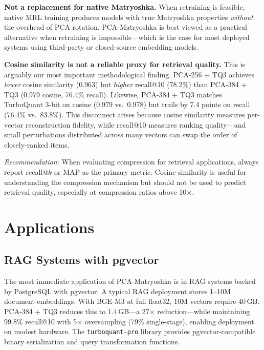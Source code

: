 \documentclass[journal]{IEEEtran}
\begin{document}
\textbf{Not a replacement for native Matryoshka.}
When retraining is feasible, native MRL training produces models with true Matryoshka properties \emph{without} the overhead of PCA rotation.
PCA-Matryoshka is best viewed as a practical alternative when retraining is impossible---which is the case for most deployed systems using third-party or closed-source embedding models.

\textbf{Cosine similarity is not a reliable proxy for retrieval quality.}
This is arguably our most important methodological finding.
PCA-256 + TQ3 achieves \emph{lower} cosine similarity (0.963) but \emph{higher}
recall@10 (78.2\%) than PCA-384 + TQ3 (0.979 cosine, 76.4\% recall).
Likewise, PCA-384 + TQ3 matches TurboQuant 3-bit on cosine (0.979 vs.\ 0.978) but
trails by 7.4 points on recall (76.4\% vs.\ 83.8\%).
This disconnect arises because cosine similarity measures per-vector reconstruction
fidelity, while recall@10 measures ranking quality---and small perturbations
distributed across many vectors can swap the order of closely-ranked items.

\emph{Recommendation:} When evaluating compression for retrieval applications,
always report recall@$k$ or MAP as the primary metric.  Cosine similarity is
useful for understanding the compression mechanism but should not be used to
predict retrieval quality, especially at compression ratios above 10$\times$.


\section{Applications}
\label{sec:applications}

\subsection{RAG Systems with pgvector}

The most immediate application of PCA-Matryoshka is in RAG systems backed by PostgreSQL with pgvector.
A typical RAG deployment stores 1--10M document embeddings.
With BGE-M3 at full float32, 10M vectors require 40\,GB.
PCA-384 + TQ3 reduces this to 1.4\,GB---a 27$\times$ reduction---while maintaining 99.8\% recall@10 with 5$\times$ oversampling (79\% single-stage), enabling deployment on modest hardware.
The \texttt{turboquant-pro} library provides pgvector-compatible binary serialization and query transformation functions.
\end{document}
